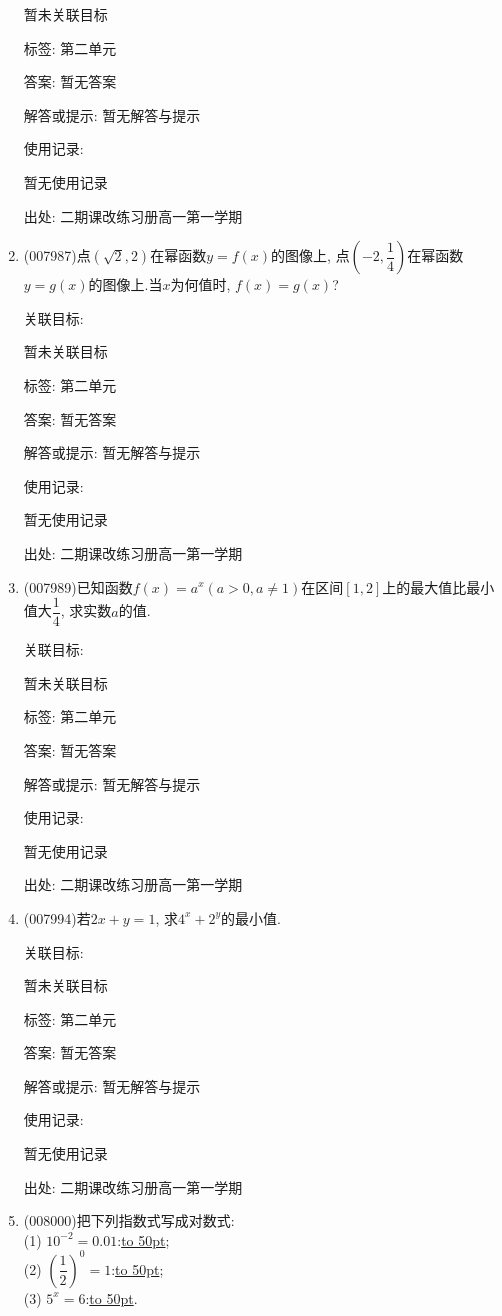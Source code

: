 \documentclass[10pt,a4paper]{article}
\newcommand{\blank}[1]{\underline{\hbox to #1pt{}}}
\begin{document}
\begin{enumerate}[1.]
暂未关联目标



标签: 第二单元

答案: 暂无答案

解答或提示: 暂无解答与提示

使用记录:

暂无使用记录


出处: 二期课改练习册高一第一学期
\item { (007987)}点$(\sqrt 2,2)$在幂函数$y=f(x)$的图像上, 点$(-2,\dfrac 14)$在幂函数$y=g(x)$的图像上.当$x$为何值时, $f(x)=g(x)$?


关联目标:

暂未关联目标



标签: 第二单元

答案: 暂无答案

解答或提示: 暂无解答与提示

使用记录:

暂无使用记录


出处: 二期课改练习册高一第一学期
\item { (007989)}已知函数$f(x)=a^x(a>0,a\ne 1)$在区间$[1,2]$上的最大值比最小值大$\dfrac 14$, 求实数$a$的值.


关联目标:

暂未关联目标



标签: 第二单元

答案: 暂无答案

解答或提示: 暂无解答与提示

使用记录:

暂无使用记录


出处: 二期课改练习册高一第一学期
\item { (007994)}若$2x+y=1$, 求$4^x+2^y$的最小值.


关联目标:

暂未关联目标



标签: 第二单元

答案: 暂无答案

解答或提示: 暂无解答与提示

使用记录:

暂无使用记录


出处: 二期课改练习册高一第一学期
\item { (008000)}把下列指数式写成对数式:\\
(1) $10^{-2}=0.01$:\blank{50};\\
(2) $(\dfrac 12)^0=1$:\blank{50};\\
(3) $5^x=6$:\blank{50}.



\end{enumerate}
\end{document}
